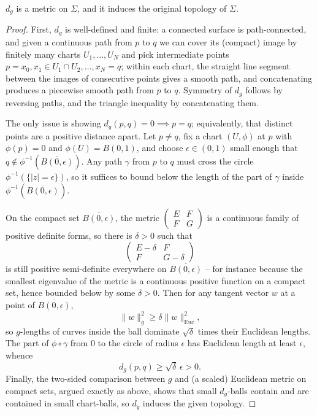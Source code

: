\documentclass[a4paper]{scrartcl}
\begin{document}
\begin{proposition}
    $d_g$ is a metric on $\Sigma$, and it induces the original topology of $\Sigma$.
\end{proposition}
\begin{proof}
    First, $d_g$ is well-defined and finite: a connected surface is path-connected, and given a continuous path from $p$ to $q$ we can cover its (compact) image by finitely many charts $U_1, \dots, U_N$ and pick intermediate points $p = x_0, x_1 \in U_1 \cap U_2, \dots, x_N = q$; within each chart, the straight line segment between the images of consecutive points gives a smooth path, and concatenating produces a piecewise smooth path from $p$ to $q$. Symmetry of $d_g$ follows by reversing paths, and the triangle inequality by concatenating them.

    The only issue is showing $d_g(p, q) = 0 \implies p = q$; equivalently, that distinct points are a positive distance apart. Let $p \neq q$, fix a chart $(U, \phi)$ at $p$ with $\phi(p) = 0$ and $\phi(U) = B(0, 1)$, and choose $\epsilon \in (0,1)$ small enough that $q \notin \phi^{-1}(\overline{B(0, \epsilon)})$. Any path $\gamma$ from $p$ to $q$ must cross the circle $\phi^{-1}(\{|z| = \epsilon\})$, so it suffices to bound below the length of the part of $\gamma$ inside $\phi^{-1}(\overline{B(0, \epsilon)})$.

    On the compact set $\overline{B(0,\epsilon)}$, the metric $\begin{pmatrix} E & F \\ F & G\end{pmatrix}$ is a continuous family of positive definite forms, so there is $\delta > 0$ such that
    $$
    \begin{pmatrix} E - \delta & F \\ F & G - \delta \end{pmatrix}
    $$
    is still positive semi-definite everywhere on $\overline{B(0,\epsilon)}$ -- for instance because the smallest eigenvalue of the metric is a continuous positive function on a compact set, hence bounded below by some $\delta > 0$. Then for any tangent vector $w$ at a point of $\overline{B(0, \epsilon)}$,
    $$
    \|w\|_g^2 \geq \delta \|w\|_{\text{Euc}}^2,
    $$
    so $g$-lengths of curves inside the ball dominate $\sqrt{\delta}$ times their Euclidean lengths. The part of $\phi \circ \gamma$ from $0$ to the circle of radius $\epsilon$ has Euclidean length at least $\epsilon$, whence
    $$
    d_g(p, q) \geq \sqrt{\delta}\, \epsilon > 0.
    $$
    Finally, the two-sided comparison between $g$ and (a scaled) Euclidean metric on compact sets, argued exactly as above, shows that small $d_g$-balls contain and are contained in small chart-balls, so $d_g$ induces the given topology.
\end{proof}
\end{document}
